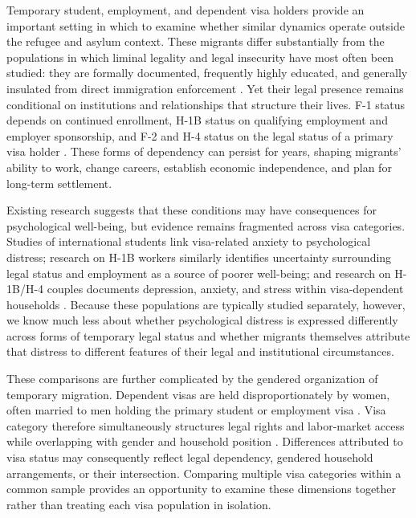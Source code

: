 \documentclass[12pt]{article}
\begin{document}
Temporary student, employment, and dependent visa holders provide an important setting in which to examine whether similar
dynamics operate outside the refugee and asylum context. These migrants differ substantially from the populations in which
liminal legality and legal insecurity have most often been studied: they are formally documented, frequently highly educated,
and generally insulated from direct immigration enforcement \citep{yangOvereducatedUnderpaidCharacteristics2026}. Yet their legal presence remains conditional on institutions and
relationships that structure their lives. F-1 status depends on continued enrollment, H-1B status on qualifying employment
and employer sponsorship, and F-2 and H-4 status on the legal status of a primary visa holder \citep{StudentsEmploymentUSCIS2025, WorkingUnitedStates2025}. These forms of dependency
can persist for years, shaping migrants' ability to work, change careers, establish economic independence, and plan for
long-term settlement\citep{parkTransitionLegalStatus2025, bakhshalizadehImpactF2Visa2025, thronsonDerivativeDilemmaGendered2024}.

Existing research suggests that these conditions may have consequences for psychological well-being, but evidence remains
fragmented across visa categories. Studies of international students link visa-related anxiety to psychological distress;
research on H-1B workers similarly identifies uncertainty surrounding legal status and employment as a source of poorer
well-being; and research on H-1B/H-4 couples documents depression, anxiety, and stress within visa-dependent households
\citep{lynchInternationalStudentTrauma2024,chenSupportingInternationalStudents2024, parkImpactChangingNonimmigrant2022,
    chaudhuriHealthWellbeingHighly, prasathMarriedAsianIndians2023}.
Because these populations are typically studied separately, however, we know much less about whether psychological distress
is expressed differently across forms of temporary legal status and whether migrants themselves attribute that distress
to different features of their legal and institutional circumstances.

These comparisons are further complicated by the gendered organization of temporary migration. Dependent visas are held
disproportionately by women, often married to men holding the primary student or employment visa \citep{zavodnyNFAPPOLICYBRIEF}. Visa category therefore
simultaneously structures legal rights and labor-market access while overlapping with gender and household position \citep{siddiqiBuildingInvisibleWall2019, bordoloiAmStandingStill2015, bakhshalizadehImpactF2Visa2025}.
Differences attributed to visa status may consequently reflect legal dependency, gendered household arrangements, or their
intersection. Comparing multiple visa categories within a common sample provides an opportunity to examine these dimensions
together rather than treating each visa population in isolation.
\end{document}
